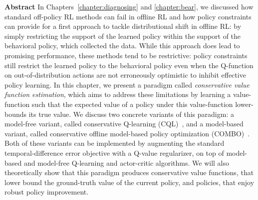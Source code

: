 \documentclass[../thesis.tex]{subfiles}
\begin{document}

\vspace{-0.4cm}
\begin{AIbox}{\large{\textbf{Abstract}}}
\vspace{4mm}
In Chapters~\ref{chapter:diagnosing} and \ref{chapter:bear}, we discussed how standard off-policy RL methods can fail in offline RL and how policy constraints can provide for a first approach to tackle distributional shift in offline RL: by simply restricting the support of the learned policy within the support of the behavioral policy, which collected the data. While this approach does lead to promising performance, these methods tend to be restrictive: policy constraints still restrict the learned policy to the behavioral policy even when the Q-function on out-of-distribution actions are not erroneously optimistic to inhibit effective policy learning.                 
In this chapter, we present a paradigm called \emph{conservative value function estimation}, which aims to address these limitations by learning a value-function such that the expected value of a policy under this value-function lower-bounds its true value. We discuss two concrete variants of this paradigm: a model-free variant, called conservative Q-learning (CQL)~\citep{kumar2020conservative}, and a model-based variant, called conservative offline model-based policy optimization (COMBO)~\citep{yu2021conservative}. Both of these variants can be implemented by augmenting the standard temporal-difference error objective with a Q-value regularizer, on top of model-based and model-free Q-learning and actor-critic algorithms. We will also theoretically show that this paradigm produces conservative value functions, that lower bound the ground-truth value of the current policy, and policies, that enjoy robust policy improvement.
\vspace{2mm}
\end{AIbox}
\end{document}
